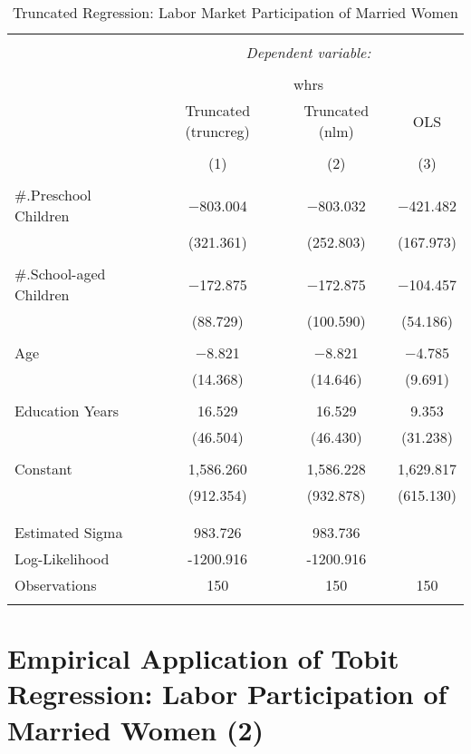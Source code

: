 \documentclass[
  12pt,
]{article}
\begin{document}
\begin{table}[t] \centering 
  \caption{Truncated Regression: Labor Market Participation of Married Women} 
  \label{lfp} 
\begin{tabular}{@{\extracolsep{5pt}}lccc} 
\\[-1.8ex]\hline 
\hline \\[-1.8ex] 
 & \multicolumn{3}{c}{\textit{Dependent variable:}} \\ 
\cline{2-4} 
\\[-1.8ex] & \multicolumn{3}{c}{whrs} \\ 
 & Truncated (truncreg) & Truncated (nlm) & OLS \\ 
\\[-1.8ex] & (1) & (2) & (3)\\ 
\hline \\[-1.8ex] 
 \#.Preschool Children & $-$803.004 & $-$803.032 & $-$421.482 \\ 
  & (321.361) & (252.803) & (167.973) \\ 
  & & & \\ 
 \#.School-aged Children & $-$172.875 & $-$172.875 & $-$104.457 \\ 
  & (88.729) & (100.590) & (54.186) \\ 
  & & & \\ 
 Age & $-$8.821 & $-$8.821 & $-$4.785 \\ 
  & (14.368) & (14.646) & (9.691) \\ 
  & & & \\ 
 Education Years & 16.529 & 16.529 & 9.353 \\ 
  & (46.504) & (46.430) & (31.238) \\ 
  & & & \\ 
 Constant & 1,586.260 & 1,586.228 & 1,629.817 \\ 
  & (912.354) & (932.878) & (615.130) \\ 
  & & & \\ 
\hline \\[-1.8ex] 
Estimated Sigma & 983.726 & 983.736 &  \\ 
Log-Likelihood & -1200.916 & -1200.916 &  \\ 
Observations & 150 & 150 & 150 \\ 
\hline 
\hline \\[-1.8ex] 
\end{tabular} 
\end{table}

\clearpage

\hypertarget{empirical-application-of-tobit-regression-labor-participation-of-married-women-2}{%
\section{Empirical Application of Tobit Regression: Labor Participation
of Married Women
(2)}\label{empirical-application-of-tobit-regression-labor-participation-of-married-women-2}}
\end{document}

